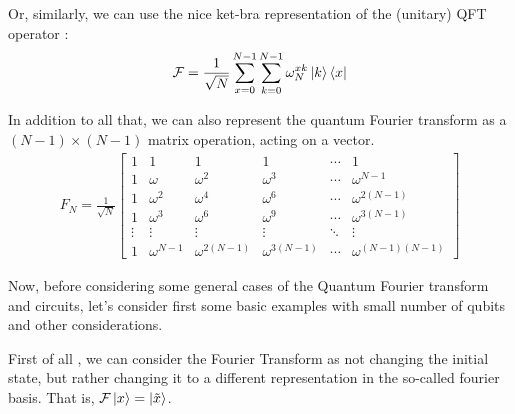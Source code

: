 Or, similarly, we can use the nice ket-bra representation of the (unitary) QFT operator \cite{noauthor_quantum_nodate}:
\begin{gather}
  \mathcal{F}=\frac{1}{\sqrt{N}} \sum_{x=0}^{N-1} \sum_{k=0}^{N-1} \omega_{N}^{xk}\ket{k}\bra{x}
\end{gather}

In addition to all that, we can also represent the quantum Fourier transform as a $(N-1)\times (N-1)$ matrix operation, acting on a vector.
\begin{gather}
  F_N=\frac{1}{\sqrt{N}} 
  \begin{bmatrix}
    1     & 1     & 1     & 1     & \cdots & 1    \\
    1     &\omega &\omega^2 & \omega^3 & \cdots & \omega^{N-1}\\
    1     &\omega^2 &\omega^4 & \omega^6 & \cdots & \omega^{2(N-1)}\\
    1     &\omega^3 &\omega^6 & \omega^9 & \cdots & \omega^{3(N-1)}\\
    \vdots &\vdots  & \vdots  & \vdots   & \ddots & \vdots        \\
    1      & \omega^{N-1}&\omega^{2(N-1)}&\omega^{3(N-1)} & \cdots & \omega^{(N-1)(N-1)}
  \end{bmatrix}
\end{gather}


Now, before considering some general cases of the Quantum Fourier transform and circuits, let's consider first some basic examples 
with small number of qubits and other considerations.

First of all \cite{noauthor_quantum_nodate}, we can consider the Fourier Transform as not changing the initial state, but rather 
changing it to a different representation in the so-called fourier basis. That is, $\mathcal{F}\ket{x}=\ket{\tilde{x}}$.


